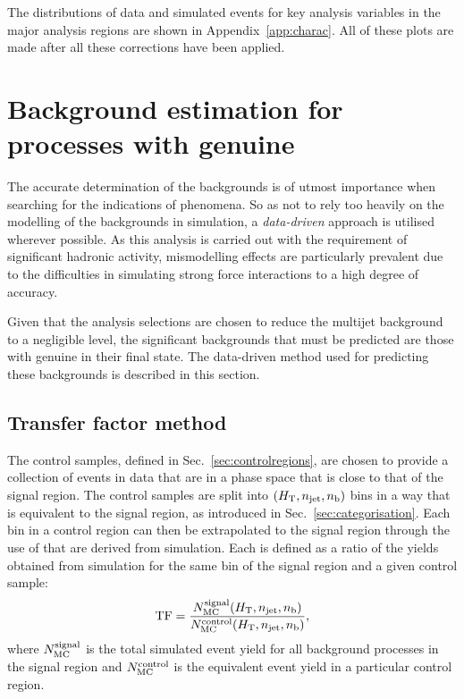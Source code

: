 The distributions of data and \MC simulated events for key analysis
variables in the major analysis regions are shown in Appendix~\ref{app:charac}. 
All of these plots are made after all these corrections have been
applied.

\section{Background estimation for processes with genuine \MET} %
\label{sec:bkgdMet}

The accurate determination of the \SM backgrounds is of utmost
importance when searching for the indications of \BSM phenomena. So as
not to rely too heavily on the modelling of the backgrounds in
simulation, a \emph{data-driven} approach is utilised wherever
possible. As this analysis is carried out with the requirement of
significant hadronic activity, mismodelling effects are particularly
prevalent due to the difficulties in simulating strong force
interactions to a high degree of accuracy.

Given that the analysis selections are chosen to reduce the \QCD
multijet background to a negligible level, the significant \SM
backgrounds that must be predicted are those with genuine \MET in
their final state. The data-driven method used for predicting these
backgrounds is described in this section.

\subsection{Transfer factor method}
\label{sec:TF}

The control samples, defined in Sec.~\ref{sec:controlregions}, are
chosen to provide a collection of events in data that are in a phase
space that is close to that of the signal region. The control samples
are split into $(\mbox{$H_\text{T}$},n_{\mathrm{jet}},n_{\text{b}})$ bins in a way that is equivalent to the
signal region, as introduced in Sec.~\ref{sec:categorisation}. Each
bin in a control region can then be extrapolated to the signal region
through the use of \emph{\TFs} that are derived from
simulation.  Each \TF is defined as a ratio of the yields
obtained from \MC simulation for the same bin of the signal region and
a given control sample:
\begin{equation}
  \label{equ:tf-ratio}
  {\rm TF} = \frac{N_{\rm MC}^{\rm signal}(\mbox{$H_\text{T}$},n_{\mathrm{jet}},n_{\text{b}})}{N_{\rm
      MC}^{\rm control}(\mbox{$H_\text{T}$},n_{\mathrm{jet}},n_{\text{b}})}, 
\end{equation}
where $N_{\rm MC}^{\rm signal}$ is the total simulated event yield for
all background processes in the signal region and $N_{\rm MC}^{\rm
control}$ is the equivalent event yield in a particular control
region.

